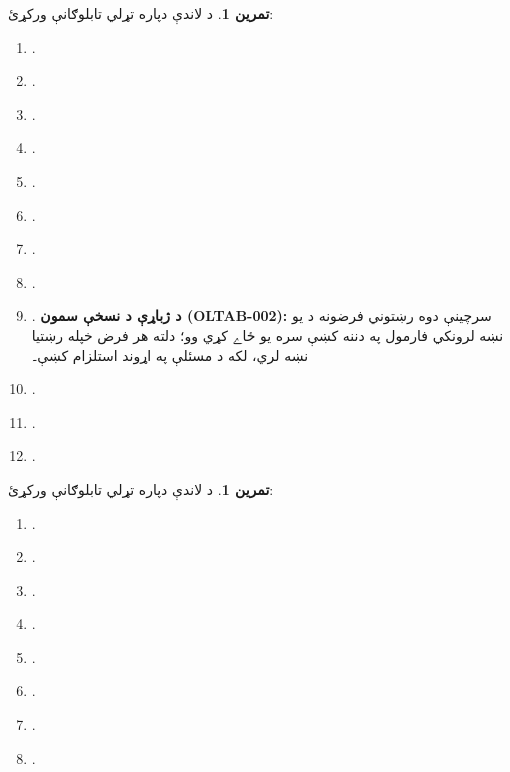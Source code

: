 \documentclass[12pt,a4paper,oneside]{report}
\theoremstyle{definition}
\newtheorem{prob}[thm]{تمرين}
\begin{document}
\label{olpseg:OLP-0103-B016:start}
\begin{prob}
د لاندې دپاره تړلي تابلوګانې ورکړئ:
\begin{enumerate}
\item {}.
\item {}.
\item {}.
\item {}.
\item {}.
\item {}.
\item {}.
\item {}.
\item {}.
\textbf{د ژباړې د نسخې سمون (OLTAB-002):} سرچينې دوه رښتوني فرضونه
د يو نښه لرونکي فارمول په دننه کښې سره يو ځاے کړي وو؛ دلته هر فرض
خپله رښتيا نښه لري، لکه د مسئلې په اړوند استلزام کښې۔
\item {}.
\item {}.
\item {}.
\end{enumerate}
\end{prob}
\label{olpseg:OLP-0103-B016:end}

\label{olpseg:OLP-0103-B017:start}
\begin{prob}
د لاندې دپاره تړلي تابلوګانې ورکړئ:
\begin{enumerate}
\item {}.
\item {}.
\item {}.
\item {}.
\item {}.
\item {}.
\item {}.
\item {}.
\end{enumerate}
\end{prob}
\label{olpseg:OLP-0103-B017:end}
\end{document}
